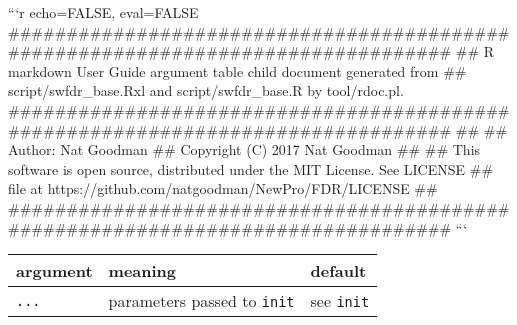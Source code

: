 ```{r echo=FALSE, eval=FALSE}
#################################################################################
## R markdown User Guide argument table child document generated from 
## script/swfdr_base.Rxl and script/swfdr_base.R by tool/rdoc.pl.
#################################################################################
##
## Author:  Nat Goodman
## Copyright (C) 2017 Nat Goodman
##
## This software is open source, distributed under the MIT License. See LICENSE
## file at https://github.com/natgoodman/NewPro/FDR/LICENSE
##
#################################################################################
```
\begingroup
\setlength{\tabcolsep}{10pt}
\renewcommand{\arraystretch}{1.2}
\centering
\begin{tabular}{m{}m{}m{}}
\toprule
argument & meaning & default\\
\midrule
\texttt{...} & parameters passed to \texttt{init} & see \texttt{init} \\
\bottomrule
\end{tabular}
\endgroup
